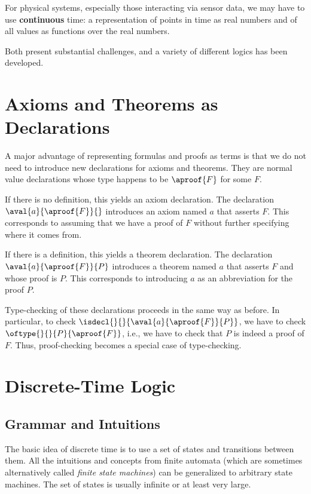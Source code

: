 For physical systems, especially those interacting via sensor data, we may have to use \textbf{continuous} time: a representation of points in time as real numbers and of all values as functions over the real numbers.

Both present substantial challenges, and a variety of different logics has been developed.

\section{Axioms and Theorems as Declarations}\label{sec:sd:axthm}

A major advantage of representing formulas and proofs as terms is that we do not need to introduce new declarations for axioms and theorems.
They are normal value declarations whose type happens to be $\aproof{F}$ for some $F$.

If there is no definition, this yields an axiom declaration.
The declaration $\aval{a}{\aproof{F}}{}$ introduces an axiom named $a$ that asserts $F$.
This corresponds to assuming that we have a proof of $F$ without further specifying where it comes from.

If there is a definition, this yields a theorem declaration.
The declaration $\aval{a}{\aproof{F}}{P}$ introduces a theorem named $a$ that asserts $F$ and whose proof is $P$.
This corresponds to introducing $a$ as an abbreviation for the proof $P$.

Type-checking of these declarations proceeds in the same way as before.
In particular, to check $\isdecl{}{}{\aval{a}{\aproof{F}}{P}}$, we have to check $\oftype{}{}{P}{\aproof{F}}$, i.e., we have to check that $P$ is indeed a proof of $F$.
Thus, proof-checking becomes a special case of type-checking.

\section{Discrete-Time Logic}\label{sec:sd:discretetime}

\subsection{Grammar and Intuitions}

The basic idea of discrete time is to use a set of states and transitions between them.
All the intuitions and concepts from finite automata (which are sometimes alternatively called \emph{finite state machines}) can be generalized to arbitrary state machines.
The set of states is usually infinite or at least very large.

